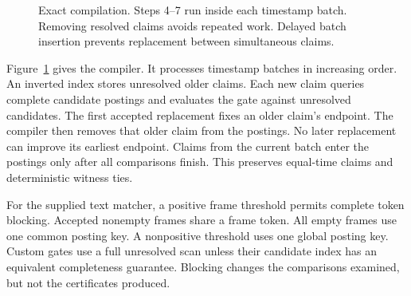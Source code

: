 \begin{figure}[t]
\centering
{}
\caption{Exact compilation. Steps 4--7 run inside each timestamp batch. Removing resolved claims avoids repeated work. Delayed batch insertion prevents replacement between simultaneous claims.}
\label{fig:compiler}
\end{figure}


Figure~\ref{fig:compiler} gives the compiler.
It processes timestamp batches in increasing order.
An inverted index stores unresolved older claims.
Each new claim queries complete candidate postings and evaluates the gate against unresolved candidates.
The first accepted replacement fixes an older claim's endpoint.
The compiler then removes that older claim from the postings.
No later replacement can improve its earliest endpoint.
Claims from the current batch enter the postings only after all comparisons finish.
This preserves equal-time claims and deterministic witness ties.

For the supplied text matcher, a positive frame threshold permits complete token blocking.
Accepted nonempty frames share a frame token.
All empty frames use one common posting key.
A nonpositive threshold uses one global posting key.
Custom gates use a full unresolved scan unless their candidate index has an equivalent completeness guarantee.
Blocking changes the comparisons examined, but not the certificates produced.


